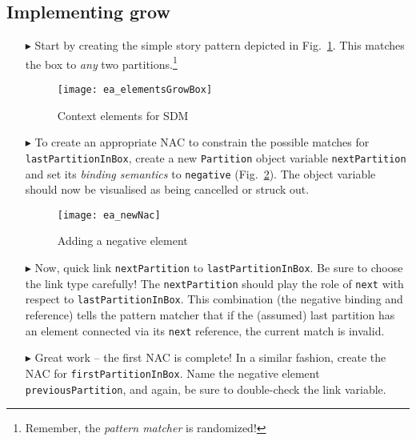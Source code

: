 \newpage
\hypertarget{growBox vis}{}
\subsection{Implementing grow}
\visHeader

\begin{itemize}
 
\item[$\blacktriangleright$] Start by creating the simple story pattern depicted in Fig.~\ref{fig:sdm_grow_1}. This matches the box to \emph{any} two
partitions.\footnote{Remember, the \emph{pattern matcher} is randomized!}

\vspace{0.5cm}

\begin{figure}[htbp]
\begin{center}
  \texttt{[image: ea\_elementsGrowBox]}
  \caption{Context elements for SDM}  
  \label{fig:sdm_grow_1}
\end{center}
\end{figure}

\item[$\blacktriangleright$] To create an appropriate \mbox{NAC} to constrain the possible matches for \texttt{lastPartitionInBox},  create a new
\texttt{Partition} object variable \texttt{next\-Part\-ition} and set its \emph{binding semantics} to \texttt{negative} (Fig.~\ref{fig:sdm_grow_2}). The object
variable should now be visualised as being cancelled or struck out.
 
\begin{figure}[htbp]
\begin{center}
  \texttt{[image: ea\_newNac]}
  \caption{Adding a negative element}  
  \label{fig:sdm_grow_2}
\end{center}
\end{figure}
 
\item[$\blacktriangleright$] Now, quick link \texttt{nextPartition} to \texttt{lastPartitionInBox}. Be sure to choose the link type carefully! The
\texttt{nextPartition} should play the role of \texttt{next} with respect to \texttt{lastPartitionInBox}. This combination (the negative binding and reference)
tells the pattern matcher that if the (assumed) last partition has an element connected via its \texttt{next} reference, the current match is invalid.

\item[$\blacktriangleright$] Great work -- the first NAC is complete! In a similar fashion, create the NAC for \texttt{firstPartitionInBox}. Name the
negative element \texttt{previousPartition}, and again, be sure to double-check the link variable.


\end{itemize}
